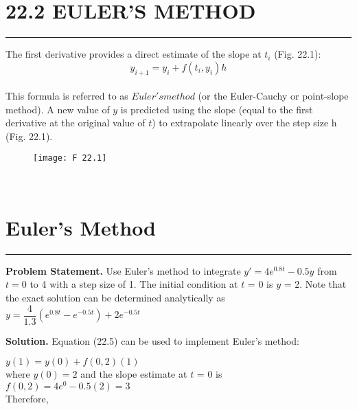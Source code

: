 \documentclass[../main.tex]{subfiles}
\begin{document}
\vspace{0,6in}
\section{22.2 EULER'S METHOD}
\vspace{0,1in}
\hrule
\vspace{0,1in}
The first derivative provides a direct estimate of the slope at $t_{i}$ (Fig. 22.1):
\begin{equation}
\tag{22.5}
y_{i+1} = y_{i} + f(t_{i},y_{i})h
\end{equation}\\
This formula is referred to as $Euler's method$ (or the Euler-Cauchy or point-slope method).
A new value of $y$ is predicted using the slope (equal to the first derivative at the original
value of $t$) to extrapolate linearly over the step size h (Fig. 22.1).\\
\begin{figure}[hbt!]
	\texttt{[image: F 22.1]}
	\label{F 22.1}
\end{figure}\\

\vspace{0,3in}
\section{Euler's Method}
\vspace{0,1in}
\hrule
\vspace{0,1in}
\textbf{Problem Statement.} Use Euler's method to integrate $y' = 4e^{0.8t} - 0.5y$ from $t = 0$ to 4 with a step size of 1. The initial condition at $t$ = 0 is $y$ = 2. Note that the exact solution can
be determined analytically as\\

$y= \dfrac{4}{1.3} (e^{0.8t} - e^{-0.5t}) + 2e^{-0.5t} $

\vspace{0.2in}
\textbf{Solution.} Equation (22.5) can be used to implement Euler's method:

$y(1) = y(0) + f(0,2)(1)$\\

where $y(0) = 2$ and the slope estimate at $t$ = 0 is\\

$f(0,2) = 4e^0 - 0.5(2) = 3$\\

Therefore,\\
\end{document}
